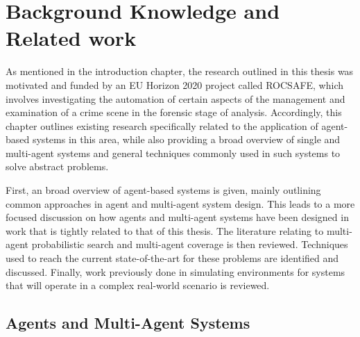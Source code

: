 

\chapter{Background Knowledge and Related work}

\workinprogress

As mentioned in the introduction chapter, the research outlined in this thesis was motivated and funded by an EU Horizon 2020 project called ROCSAFE, which involves investigating the automation of certain aspects of the management and examination of a crime scene in the forensic stage of analysis. Accordingly, this chapter outlines existing research specifically related to the application of agent-based systems in this area, while also providing a broad overview of single and multi-agent systems and general techniques commonly used in such systems to solve abstract problems. \par
First, an broad overview of agent-based systems is given, mainly outlining common approaches in agent and multi-agent system design. This leads to a more focused discussion on how agents and multi-agent systems have been designed in work that is tightly related to that of this thesis. The literature relating to multi-agent probabilistic search and multi-agent coverage is then reviewed. Techniques used to reach the current state-of-the-art for these problems are identified and discussed. Finally, work previously done in simulating environments for systems that will operate in a complex real-world scenario is reviewed.



\section{Agents and Multi-Agent Systems}


